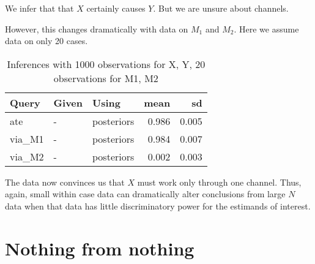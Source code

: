 \documentclass[
  12pt,
]{book}
\newenvironment{Shaded}{\begin{snugshade}}{\end{snugshade}}
\newcommand{\DataTypeTok}[1]{\textcolor[rgb]{0.13,0.29,0.53}{#1}}
\newcommand{\KeywordTok}[1]{\textcolor[rgb]{0.13,0.29,0.53}{\textbf{#1}}}
\newcommand{\NormalTok}[1]{#1}
\newcommand{\OperatorTok}[1]{\textcolor[rgb]{0.81,0.36,0.00}{\textbf{#1}}}
\newcommand{\OtherTok}[1]{\textcolor[rgb]{0.56,0.35,0.01}{#1}}
\newcommand{\StringTok}[1]{\textcolor[rgb]{0.31,0.60,0.02}{#1}}
\begin{document}
We infer that that \(X\) certainly causes \(Y\). But we are unsure about channels.

However, this changes dramatically with data on \(M_1\) and \(M_2\). Here we assume data on only 20 cases.

\begin{Shaded}
\end{Shaded}

\begin{table}

\caption{\label{tab:apppaths6}Inferences with 1000 observations for X, Y,  20 observations for M1, M2}
\centering
\begin{tabular}[t]{l|l|l|r|r}
\hline
Query & Given & Using & mean & sd\\
\hline
ate & - & posteriors & 0.986 & 0.005\\
\hline
via\_M1 & - & posteriors & 0.984 & 0.007\\
\hline
via\_M2 & - & posteriors & 0.002 & 0.003\\
\hline
\end{tabular}
\end{table}

The data now convinces us that \(X\) must work only through one channel. Thus, again, small within case data can dramatically alter conclusions from large \(N\) data when that data has little discriminatory power for the estimands of interest.

\hypertarget{nothing-from-nothing}{%
\section{Nothing from nothing}\label{nothing-from-nothing}}
\end{document}
